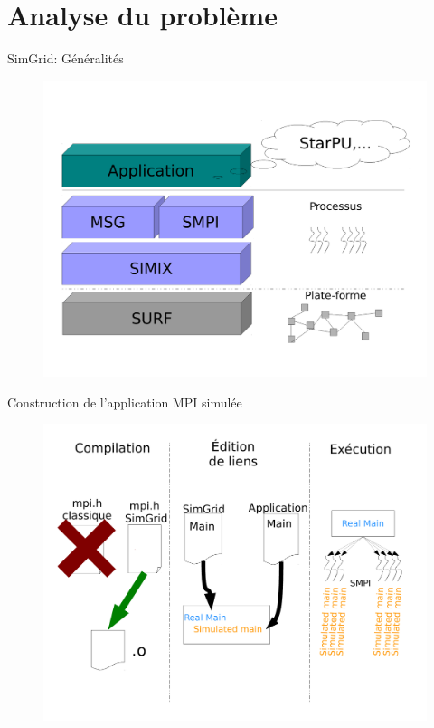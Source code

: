 \documentclass[11pt,xcolor=dvipsnames,presentation]{beamer}
\begin{document}
\section{Analyse du problème}
\label{sec-3}
\begin{frame}[label=sec-3-1]{SimGrid: Généralités}
\begin{figure}
\centering
\vspace{-4.5mm}
\includegraphics[width=\linewidth]{../Img/Simgrid.pdf}
\end{figure}
\end{frame}

\begin{frame}[label=sec-3-2]{Construction de l'application MPI simulée}
\begin{figure}
\centering
\vspace{-3.5mm}
\includegraphics[width=\linewidth]{./Slides/Compilev2.pdf}
\end{figure}
\end{frame}
\end{document}
